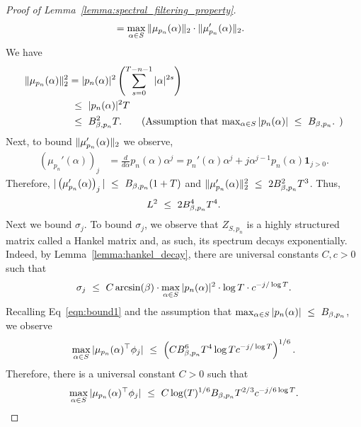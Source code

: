 \begin{proof}[Proof of Lemma~\ref{lemma:spectral_filtering_property}]
\begin{align*}
    & = \max_{\alpha \in S} \|\mu_{p_n}(\alpha)\|_2 \cdot \|\mu'_{p_n}(\alpha)\|_2.
\end{align*}
We have
\begin{align*}
    \norm{\mu_{p_n}(\alpha)}_2^2 & = \abs{p_n(\alpha)}^2 \left( \sum_{s = 0}^{T-n-1} \abs{\alpha}^{2s} \right) \\
    & \leq \abs{p_n(\alpha)}^2  T \\
    & \leq \pbnd^2 T.\tag{Assumption that $\max_{\alpha \in S} \abs{p_n(\alpha)}  \leq \pbnd$. }
\end{align*}
Next, to bound $\|\mu_{p_n}'(\alpha)\|_2$ we observe,
\begin{align*}
    \left( \mu_{p_n}'(\alpha) \right)_j & = \frac{d}{d \alpha} p_n(\alpha) \alpha^j  =  p_n'(\alpha) \alpha^j + j \alpha^{j-1} p_n(\alpha) \mathbf{1}_{j > 0}.
\end{align*}
Therefore, $ |\left( \mu_{p_n}'(\alpha) \right)_j| ~\le~ B_{\beta, p_n}(1 + T)$ and $\|\mu_{p_n}'(\alpha)\|_2^2 ~\le~ 2 B_{\beta, p_n}^2 T^3$. Thus,
\begin{equation}
    L^2 ~\le~ 2 B_{\beta, p_n}^4 T^4.
\end{equation}
Next we bound $\sigma_j$. To bound $\sigma_j$, we observe that $Z_{S,p_n}$ is a highly structured matrix called a Hankel matrix and, as such, its spectrum decays exponentially. Indeed, by Lemma~\ref{lemma:hankel_decay}, there are universal constants $C,c >0$ such that
\begin{equation}
\label{eqn:bound2}
   \sigma_j ~\le~   C \arcsin(\beta)  \cdot \max_{\alpha \in S} |p_n(\alpha)|^2 \cdot \log T \cdot c^{-j/\log T}.
\end{equation}
Recalling Eq~\eqref{eqn:bound1} and the assumption that $\max_{\alpha \in S} |p_n(\alpha)| ~\le~ B_{\beta, p_n}$, we observe
\begin{equation*}
    \max_{\alpha \in S} |\mu_{p_n}(\alpha)^{\top} \phi_j| ~\le~ \left( C B_{\beta, p_n}^6 T^4 \log T c^{-j/\log T} \right)^{1/6}.
\end{equation*}
Therefore, there is a universal constant $C>0$ such that 
\begin{equation*}
    \max_{\alpha \in S} |\mu_{p_n}(\alpha)^{\top} \phi_j| ~\le~ C \log(T)^{1/6}  B_{\beta, p_n} T^{2/3} c^{-j/6 \log T} .
\end{equation*}
\end{proof}




